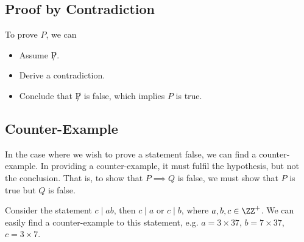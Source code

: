 \subsection{Proof by Contradiction}

\begin{recipe}
    To prove $P$, we can
    \begin{itemize}
        \item Assume $\not P$.
        \item Derive a contradiction.
        \item Conclude that $\not P$ is false, which implies $P$ is true.
    \end{itemize}
\end{recipe}

\subsection{Counter-Example}

In the case where we wish to prove a statement false, we can find a counter-example. In providing a counter-example, it must fulfil the hypothesis, but not the conclusion. That is, to show that $P \implies Q$ is false, we must show that $P$ is true but $Q$ is false.

\begin{example}
    Consider the statement $c \mid ab$, then $c \mid a$ or $c \mid b$, where $a, b, c \in \ZZ^+$. We can easily find a counter-example to this statement, e.g. $a = 3 \times 37$, $b = 7 \times 37$, $c = 3 \times 7$.
\end{example}